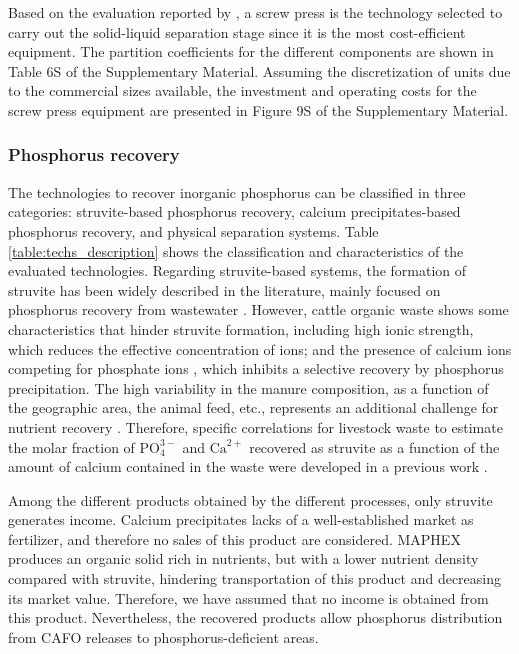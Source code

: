 \begin{refsection}[referencesCh4]
Based on the evaluation reported by \citet{MollerSLsep}, a screw press is the technology selected to carry out the solid-liquid separation stage since it is the most cost-efficient
equipment. The partition coefficients for the different components are shown in Table 6S of the Supplementary Material. Assuming the discretization of units due to the commercial sizes available, the investment and operating costs for the screw press equipment are presented in Figure 9S of the Supplementary Material.

\subsubsection{Phosphorus recovery}
The technologies to recover inorganic phosphorus can be classified in three categories: struvite-based phosphorus recovery, calcium precipitates-based phosphorus recovery, and physical separation systems. Table \ref{table:techs_description} shows the classification and characteristics of the evaluated technologies. Regarding struvite-based systems, the formation of struvite has been widely described in the  literature, mainly focused on phosphorus recovery from wastewater \citep{rahaman_modeling_2014, Battistoni}. 
However, cattle organic waste shows some characteristics that hinder struvite formation, including high ionic strength, which reduces the effective concentration of ions; and the presence of calcium ions competing for phosphate ions \citep{Yan2016}, which inhibits a selective recovery by phosphorus precipitation. The high variability in the manure composition, as a function of the geographic area, the animal feed, etc., represents an additional challenge for nutrient recovery \citep{Tao}. Therefore, specific correlations for livestock waste to estimate the molar fraction of $\text{PO}_{4}^{3-}$ and $\text{Ca}^{2+}$ recovered as struvite as a function of the amount of calcium contained in the waste were developed in a previous work \citep{MartinStruvite}. 

Among the different products obtained by the different processes, only struvite generates income. Calcium precipitates lacks of a well-established market as fertilizer, and therefore no sales of this product are considered. MAPHEX produces an organic solid rich in nutrients, but with a lower nutrient density compared with struvite, hindering transportation of this product and decreasing its market value. Therefore, we have assumed that no income is obtained from this product. Nevertheless, the recovered products allow phosphorus distribution from CAFO releases to phosphorus-deficient areas.


\end{refsection}
